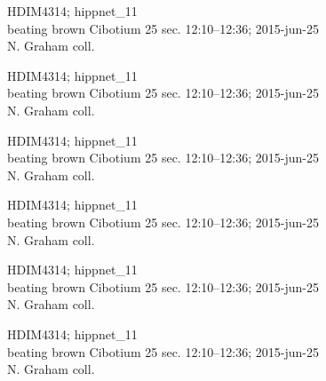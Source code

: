 \documentclass[2pt]{extarticle}
\begin{document}
\noindent
\parbox{0.16\textwidth}{\tiny \raggedright \rule[-0.3\baselineskip]{0pt}{10pt}HDIM4314; hippnet\_11\\ beating brown Cibotium 25 sec. 12:10--12:36; 2015-jun-25\\ N. Graham coll.}
\parbox{0.16\textwidth}{\tiny \raggedright \rule[-0.3\baselineskip]{0pt}{10pt}HDIM4314; hippnet\_11\\ beating brown Cibotium 25 sec. 12:10--12:36; 2015-jun-25\\ N. Graham coll.}
\parbox{0.16\textwidth}{\tiny \raggedright \rule[-0.3\baselineskip]{0pt}{10pt}HDIM4314; hippnet\_11\\ beating brown Cibotium 25 sec. 12:10--12:36; 2015-jun-25\\ N. Graham coll.}
\parbox{0.16\textwidth}{\tiny \raggedright \rule[-0.3\baselineskip]{0pt}{10pt}HDIM4314; hippnet\_11\\ beating brown Cibotium 25 sec. 12:10--12:36; 2015-jun-25\\ N. Graham coll.}
\parbox{0.16\textwidth}{\tiny \raggedright \rule[-0.3\baselineskip]{0pt}{10pt}HDIM4314; hippnet\_11\\ beating brown Cibotium 25 sec. 12:10--12:36; 2015-jun-25\\ N. Graham coll.}
\parbox{0.16\textwidth}{\tiny \raggedright \rule[-0.3\baselineskip]{0pt}{10pt}HDIM4314; hippnet\_11\\ beating brown Cibotium 25 sec. 12:10--12:36; 2015-jun-25\\ N. Graham coll.} \\ 
\vspace{0.001in} 
\end{document}

